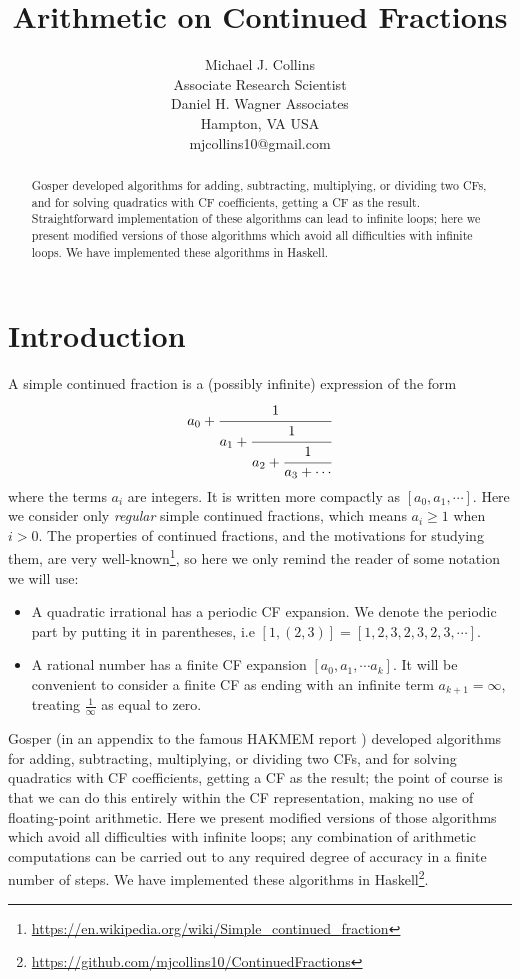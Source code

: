 \documentclass[11pt, oneside]{amsart}   	%
\title{Arithmetic on Continued Fractions}
\author{Michael J. Collins\\Associate Research Scientist\\Daniel H. Wagner Associates\\Hampton, VA USA\\mjcollins10@gmail.com}
\begin{document}
\begin{abstract}
Gosper  developed algorithms for adding, subtracting, multiplying, or dividing two CFs, and for solving quadratics with CF coefficients,
getting a CF as the result. Straightforward implementation of these algorithms can lead to infinite loops; here we present modified versions of those algorithms which avoid all difficulties with infinite loops.
We have implemented these algorithms in Haskell.
\end{abstract}

\maketitle

\section{Introduction}
A simple continued fraction is a (possibly infinite) expression of the form
\begin{equation*}
a_0+\cfrac{1}{a_1+\cfrac{1}{a_2+\cfrac{1}{a_3+\cdots}}}
\end{equation*}
where the terms $a_i$ are integers. It is written more compactly as $[a_0, a_1, \cdots]$. Here we consider only \emph{regular} simple continued fractions, which means $a_i \geq 1$ when $i>0$. The
properties of continued fractions, and the motivations for studying them, are very well-known\footnote{\href{https://en.wikipedia.org/wiki/Simple\_continued\_fraction}{https://en.wikipedia.org/wiki/Simple\_continued\_fraction}},
so here we only remind the reader of some notation we will use:
\begin{itemize}
\item A quadratic irrational has a periodic CF expansion. We denote the periodic part by putting it in parentheses,
i.e $[1,(2,3)] = [1,2,3,2,3,2,3,\cdots]$.
\item A rational number has a finite CF expansion $[a_0,a_1, \cdots a_k]$.
It will be convenient to consider a finite CF as ending with an infinite term $a_{k+1}=\infty$, treating $\frac{1}{\infty}$ as equal to zero.
\end{itemize}
 
Gosper (in an appendix to the famous HAKMEM report \cite{hakmem}) 
developed algorithms for adding, subtracting, multiplying, or dividing two CFs, and for solving quadratics with CF coefficients, getting a CF as the result;
the point of course is that we can do this entirely within the CF representation, making no use of floating-point arithmetic. Here we
present modified versions of those algorithms which avoid all difficulties with infinite loops; any combination of arithmetic
computations can be carried out to any required degree of accuracy in a finite number of steps. We have implemented these algorithms
in Haskell\footnote{\href{https://github.com/mjcollins10/ContinuedFractions}{https://github.com/mjcollins10/ContinuedFractions}}.
\end{document}

